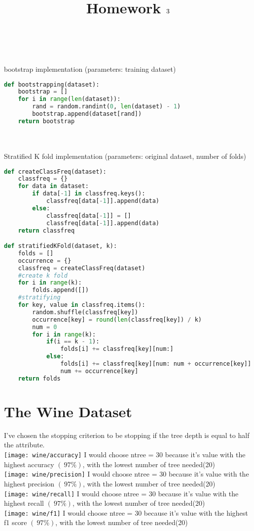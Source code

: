 \documentclass[letter]{amsart}
\title[\Class $\mid$ Homework \mypound$\HomeworkNumber$]{\Class \\ Homework \mypound$\HomeworkNumber$}
\author[\StudentName]{\StudentName \\ \StudentIDNumber}
\begin{document}
\maketitle

\newpage
bootstrap implementation (parameters: training dataset)

\begin{lstlisting}[language=Python]
def bootstrapping(dataset):
    bootstrap = []
    for i in range(len(dataset)):
        rand = random.randint(0, len(dataset) - 1)
        bootstrap.append(dataset[rand])
    return bootstrap
\end{lstlisting}
\\~\\
Stratified K fold implementation (parameters: original dataset, number of folds)
\begin{lstlisting}[language=Python]
def createClassFreq(dataset):
    classfreq = {}
    for data in dataset:
        if data[-1] in classfreq.keys():
            classfreq[data[-1]].append(data)
        else:
            classfreq[data[-1]] = []
            classfreq[data[-1]].append(data)
    return classfreq

def stratifiedKFold(dataset, k):
    folds = []
    occurrence = {}
    classfreq = createClassFreq(dataset)
    #create k fold
    for i in range(k):
        folds.append([])
    #stratifying
    for key, value in classfreq.items():
        random.shuffle(classfreq[key])
        occurrence[key] = round(len(classfreq[key]) / k)
        num = 0
        for i in range(k):
            if(i == k - 1):
                folds[i] += classfreq[key][num:]
            else:
                folds[i] += classfreq[key][num: num + occurrence[key]]
                num += occurrence[key]
    return folds
\end{lstlisting}


\newpage
\section{The Wine Dataset}
I've chosen the stopping criterion to be stopping if the tree depth is equal to half the attribute.\\
\texttt{[image: wine/accuracy]}
I would choose ntree = 30 because it's value with the highest accuracy $(~97\%)$, with the lowest number of tree needed(20)\\
\texttt{[image: wine/precision]}
I would choose ntree = 30 because it's value with the highest precision $(~97\%)$, with the lowest number of tree needed(20)\\
\texttt{[image: wine/recall]}
I would choose ntree = 30 because it's value with the highest recall $(~97\%)$, with the lowest number of tree needed(20)\\
\texttt{[image: wine/f1]}
I would choose ntree = 30 because it's value with the highest f1 score $(~97\%)$, with the lowest number of tree needed(20)\\
\end{document}
